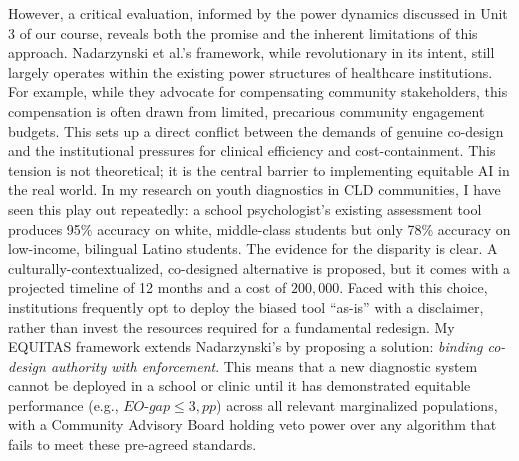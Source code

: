 \documentclass[11pt,twoside]{article}
\DeclareRobustCommand{\EOgap}{EO\text{-}gap\xspace}
\DeclareRobustCommand{\pp}{pp\xspace} %
\begin{document}
However, a critical evaluation, informed by the power dynamics discussed in Unit 3 of our course, reveals both the promise and the inherent limitations of this approach. Nadarzynski et al.’s framework, while revolutionary in its intent, still largely operates within the existing power structures of healthcare institutions. For example, while they advocate for compensating community stakeholders, this compensation is often drawn from limited, precarious community engagement budgets. This sets up a direct conflict between the demands of genuine co-design and the institutional pressures for clinical efficiency and cost-containment. This tension is not theoretical; it is the central barrier to implementing equitable AI in the real world. In my research on youth diagnostics in CLD communities, I have seen this play out repeatedly: a school psychologist's existing assessment tool produces 95\% accuracy on white, middle-class students but only 78\% accuracy on low-income, bilingual Latino students. The evidence for the disparity is clear. A culturally-contextualized, co-designed alternative is proposed, but it comes with a projected timeline of 12 months and a cost of $200,000$. Faced with this choice, institutions frequently opt to deploy the biased tool “as-is” with a disclaimer, rather than invest the resources required for a fundamental redesign. My EQUITAS framework extends Nadarzynski's by proposing a solution: \textit{binding co-design authority with enforcement}. This means that a new diagnostic system cannot be deployed in a school or clinic until it has demonstrated equitable performance (e.g., $\EOgap \le 3,\pp$) across all relevant marginalized populations, with a Community Advisory Board holding veto power over any algorithm that fails to meet these pre-agreed standards.
\end{document}
